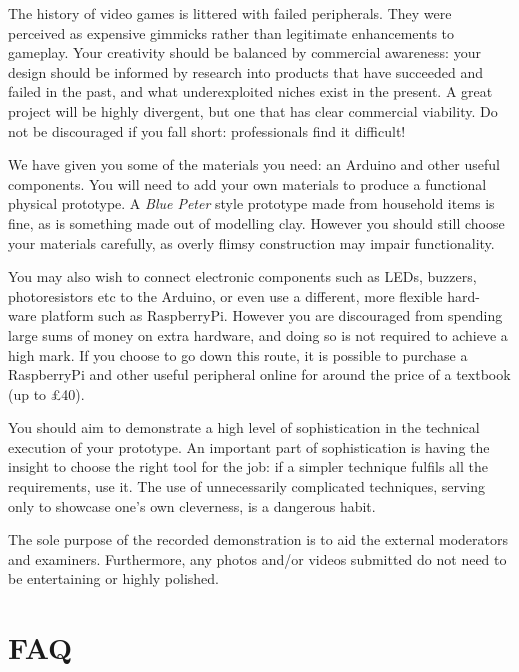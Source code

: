 \documentclass{../fal_assignment}
\begin{document}
The history of video games is littered with failed peripherals. They were perceived as expensive gimmicks rather than legitimate enhancements to gameplay. Your creativity should be balanced by commercial awareness: your design should be informed by research into products that have succeeded and failed in the past, and what underexploited niches exist in the present. A great project will be highly divergent, but one that has clear commercial viability. Do not be discouraged if you fall short: professionals find it difficult! 

We have given you some of the materials you need: an Arduino and other useful components. You will need to add your own materials to produce a functional physical prototype. A \textit{Blue Peter} style prototype made from household items is fine, as is something made out of modelling clay. However you should still choose your materials carefully, as overly flimsy construction may impair functionality. 

You may also wish to connect electronic components such as LEDs, buzzers, photoresistors etc to the Arduino, or even use a different, more flexible hard- ware platform such as RaspberryPi. However you are discouraged from spending large sums of money on extra hardware, and doing so is not required to achieve a high mark. If you choose to go down this route, it is possible to purchase a RaspberryPi and other useful peripheral online for around the price of a textbook (up to \pounds40). 

You should aim to demonstrate a high level of sophistication in the technical execution of your prototype. An important part of sophistication is having the insight to choose the right tool for the job: if a simpler technique fulfils all the requirements, use it. The use of unnecessarily complicated techniques, serving only to showcase one's own cleverness, is a dangerous habit. 

The sole purpose of the recorded demonstration is to aid the external moderators and examiners. Furthermore, any photos and/or videos submitted do not need to be entertaining or highly polished.

\section*{FAQ}
\end{document}
